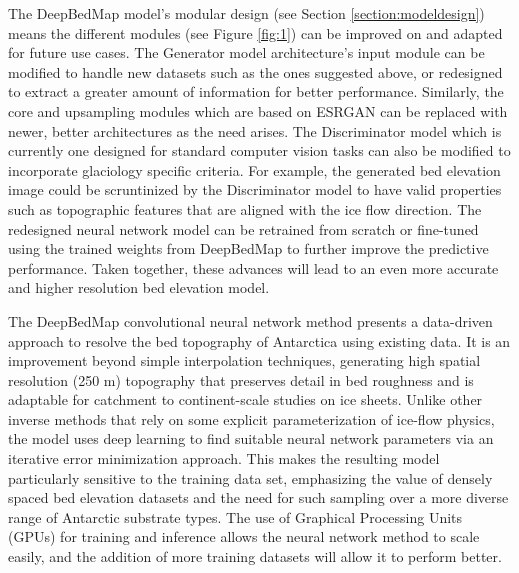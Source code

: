 \documentclass[tc, manuscript]{copernicus}
\begin{document}
The DeepBedMap model's modular design (see Section \ref{section:modeldesign}) means the different modules (see Figure \ref{fig:1}) can be improved on and adapted for future use cases.
The Generator model architecture's input module can be modified to handle new datasets such as the ones suggested above, or redesigned to extract a greater amount of information for better performance.
Similarly, the core and upsampling modules which are based on ESRGAN \citep{WangESRGANEnhancedSuperResolution2019} can be replaced with newer, better architectures as the need arises.
The Discriminator model which is currently one designed for standard computer vision tasks can also be modified to incorporate glaciology specific criteria.
For example, the generated bed elevation image could be scruntinized by the Discriminator model to have valid properties such as topographic features that are aligned with the ice flow direction.
The redesigned neural network model can be retrained from scratch or fine-tuned using the trained weights from DeepBedMap to further improve the predictive performance.
Taken together, these advances will lead to an even more accurate and higher resolution bed elevation model.

\conclusions  %

The DeepBedMap convolutional neural network method presents a data-driven approach to resolve the bed topography of Antarctica using existing data.
It is an improvement beyond simple interpolation techniques, generating high spatial resolution (250 m) topography that preserves detail in bed roughness and is adaptable for catchment to continent-scale studies on ice sheets.
Unlike other inverse methods that rely on some explicit parameterization of ice-flow physics, the model uses deep learning to find suitable neural network parameters via an iterative error minimization approach.
This makes the resulting model particularly sensitive to the training data set, emphasizing the value of densely spaced bed elevation datasets and the need for such sampling over a more diverse range of Antarctic substrate types.
The use of Graphical Processing Units (GPUs) for training and inference allows the neural network method to scale easily, and the addition of more training datasets will allow it to perform better.
\end{document}
